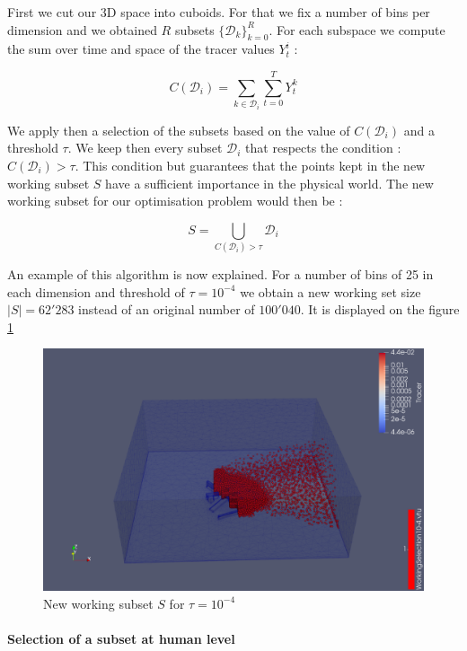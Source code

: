 First we cut our 3D space into cuboids. For that we fix a number of bins per dimension and we obtained $R$ subsets $\{\mathcal{D}_k\}_{k=0}^R $. For each subspace we compute the sum over time and space of the tracer values $Y_t^i$  : 

\begin{equation}
	C(\mathcal{D}_i) = \sum_{k \in \mathcal{D}_i} \sum_{t = 0}^T Y_t^k
\end{equation}

We apply then a selection of the subsets based on the value of $C(\mathcal{D}_i)$ and a  threshold $\tau$. We keep then every subset $\mathcal{D}_i$ that respects the condition : $C(\mathcal{D}_i) > \tau$. This condition but guarantees that the points kept in the new working subset $S$ have a sufficient importance in the physical world. The new working subset for our optimisation problem would then be : 

\begin{equation}
	S = \bigcup_{C(\mathcal{D}_i) > \tau} \mathcal{D}_i
\end{equation} 

An example of this algorithm is now explained. For a number of bins of 25 in each dimension and threshold of $\tau = 10^{-4}$ we obtain a new working set size $|S| = 62'283$ instead of an original number of $100'040$. It is displayed on the figure \ref{fig:working_subset}



\begin{figure}[t]
\centering
	\includegraphics[width = 0.8 \textwidth]{figures/Tracer/working_subset_10^-4}
	\caption{New working subset $S$ for $\tau = 10^{-4}$}
	\label{fig:working_subset}
\end{figure}

\paragraph{Selection of a subset at human level}

